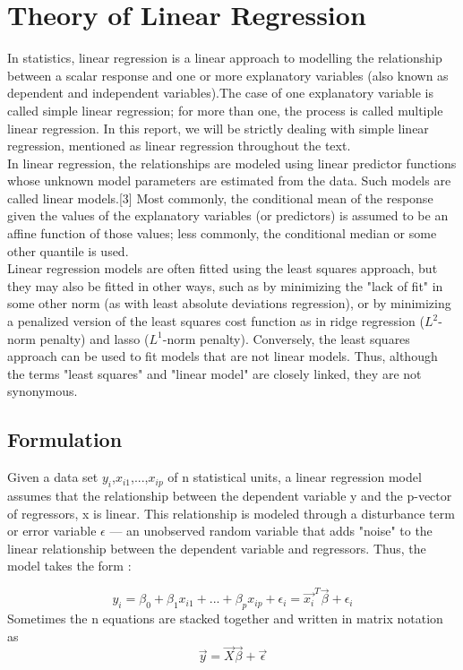 \documentclass[a4paper, 12pt]{report}
\begin{document}
    \chapter{Theory of Linear Regression}
In statistics, linear regression is a linear approach to modelling the relationship between a scalar response and one or more explanatory variables (also known as dependent and independent variables).The case of one explanatory variable is called simple linear regression; for more than one, the process is called multiple linear regression. In this report, we will be strictly dealing with simple linear regression, mentioned as linear regression throughout the text.\\
In linear regression, the relationships are modeled using linear predictor functions whose unknown model parameters are estimated from the data. Such models are called linear models.[3] Most commonly, the conditional mean of the response given the values of the explanatory variables (or predictors) is assumed to be an affine function of those values; less commonly, the conditional median or some other quantile is used.\\
Linear regression models are often fitted using the least squares approach, but they may also be fitted in other ways, such as by minimizing the "lack of fit" in some other norm (as with least absolute deviations regression), or by minimizing a penalized version of the least squares cost function as in ridge regression ($L^{2}$-norm penalty) and lasso ($L^{1}$-norm penalty). Conversely, the least squares approach can be used to fit models that are not linear models. Thus, although the terms "least squares" and "linear model" are closely linked, they are not synonymous.
    \section{Formulation}
    Given a data set {$y_{i}$,$x_{i1}$,...,$x_{ip}$} of n statistical units, a linear regression model assumes that the relationship between the dependent variable y and the p-vector of regressors, x is linear. This relationship is modeled through a disturbance term or error variable $\epsilon$ — an unobserved random variable that adds "noise" to the linear relationship between the dependent variable and regressors. Thus, the model takes the form :
    
    \begin{equation}
  {y_{i}} = \beta_{0} + \beta_{1}x_{i1} + ... + \beta_{p}x_{ip} + \epsilon_{i} = \vec{x_{i}}^T \vec{\beta} + \epsilon_{i}
    \end{equation}
    Sometimes the n equations are stacked together and written in matrix notation as 
   \begin{equation}
  \vec{y} = \vec{X} \vec{\beta} + \vec{\epsilon}
\end{equation} 
\end{document}
